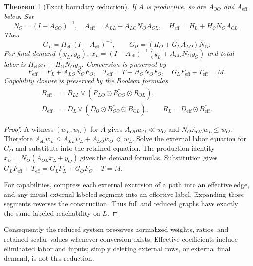 \documentclass[11pt,a4paper]{article}
\newtheorem{theorem}{Theorem}[section]
\begin{document}
\begin{theorem}[Exact boundary reduction]
If $A$ is productive, so are $A_{OO}$ and $A_{\mathrm{eff}}$ below. Set
\begin{equation}
N_O=(I-A_{OO})^{-1},\quad
A_{\mathrm{eff}}=A_{LL}+A_{LO}N_OA_{OL},\quad
H_{\mathrm{eff}}=H_L+H_ON_OA_{OL}.
\end{equation}
Then
\begin{equation}
G_L=H_{\mathrm{eff}}(I-A_{\mathrm{eff}})^{-1},\qquad
G_O=(H_O+G_LA_{LO})N_O.
\end{equation}
For final demand $(y_L,y_O)$, $x_L=(I-A_{\mathrm{eff}})^{-1}(y_L+A_{LO}N_Oy_O)$ and total labor is $H_{\mathrm{eff}}x_L+H_ON_Oy_O$. Conversion is preserved by
\begin{equation}
F_{\mathrm{eff}}=F_L+A_{LO}N_OF_O,\quad T_{\mathrm{eff}}=T+H_ON_OF_O,\quad
G_LF_{\mathrm{eff}}+T_{\mathrm{eff}}=M.
\end{equation}
Capability closure is preserved by the Boolean formulas
\begin{equation}
\begin{aligned}
B_{\mathrm{eff}}&=B_{LL}\vee(B_{LO}\odot B_{OO}^*\odot B_{OL}),\\
D_{\mathrm{eff}}&=D_L\vee(D_O\odot B_{OO}^*\odot B_{OL}),\qquad
R_L=D_{\mathrm{eff}}\odot B_{\mathrm{eff}}^*.
\end{aligned}
\end{equation}
\end{theorem}
\begin{proof}
A witness $(w_L,w_O)$ for $A$ gives $A_{OO}w_O\ll w_O$ and $N_OA_{OL}w_L\leq w_O$. Therefore $A_{\mathrm{eff}}w_L\leq A_{LL}w_L+A_{LO}w_O\ll w_L$. Solve the external labor equation for $G_O$ and substitute into the retained equation. The production identity $x_O=N_O(A_{OL}x_L+y_O)$ gives the demand formulas. Substitution gives $G_LF_{\mathrm{eff}}+T_{\mathrm{eff}}=G_LF_L+G_OF_O+T=M$.

For capabilities, compress each external excursion of a path into an effective edge, and any initial external labeled segment into an effective label. Expanding those segments reverses the construction. Thus full and reduced graphs have exactly the same labeled reachability on $L$.
\end{proof}

Consequently the reduced system preserves normalized weights, ratios, and retained scalar values whenever conversion exists. Effective coefficients include eliminated labor and inputs; simply deleting external rows, or external final demand, is not this reduction.
\end{document}
